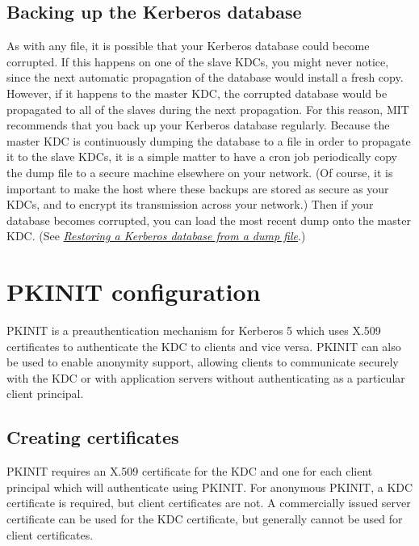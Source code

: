 \documentclass[letterpaper,10pt,english]{sphinxmanual}
\begin{document}
\section{Backing up the Kerberos database}
\label{admin/backup_host:backing-up-the-kerberos-database}
As with any file, it is possible that your Kerberos database could
become corrupted.  If this happens on one of the slave KDCs, you might
never notice, since the next automatic propagation of the database
would install a fresh copy.  However, if it happens to the master KDC,
the corrupted database would be propagated to all of the slaves during
the next propagation.  For this reason, MIT recommends that you back
up your Kerberos database regularly.  Because the master KDC is
continuously dumping the database to a file in order to propagate it
to the slave KDCs, it is a simple matter to have a cron job
periodically copy the dump file to a secure machine elsewhere on your
network.  (Of course, it is important to make the host where these
backups are stored as secure as your KDCs, and to encrypt its
transmission across your network.)  Then if your database becomes
corrupted, you can load the most recent dump onto the master KDC.
(See {\hyperref[admin/database:restore-from-dump]{\emph{Restoring a Kerberos database from a dump file}}}.)


\chapter{PKINIT configuration}
\label{admin/pkinit:pkinit-configuration}\label{admin/pkinit:pkinit}\label{admin/pkinit::doc}
PKINIT is a preauthentication mechanism for Kerberos 5 which uses
X.509 certificates to authenticate the KDC to clients and vice versa.
PKINIT can also be used to enable anonymity support, allowing clients
to communicate securely with the KDC or with application servers
without authenticating as a particular client principal.


\section{Creating certificates}
\label{admin/pkinit:creating-certificates}
PKINIT requires an X.509 certificate for the KDC and one for each
client principal which will authenticate using PKINIT.  For anonymous
PKINIT, a KDC certificate is required, but client certificates are
not.  A commercially issued server certificate can be used for the KDC
certificate, but generally cannot be used for client certificates.
\end{document}
